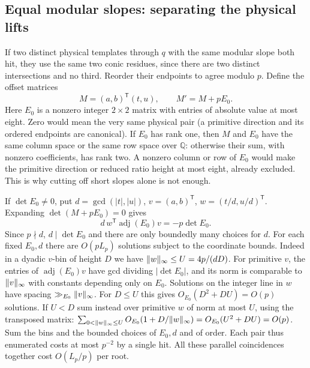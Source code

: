 \documentclass[11pt]{article}
\begin{document}
\subsection{Equal modular slopes: separating the physical lifts}
If two distinct physical templates through $q$ with the same modular slope both hit, they use the same two conic residues, since there are two distinct intersections and no third. Reorder their endpoints to agree modulo $p$. Define the offset matrices
\[
 M=(a,b)^{\mathsf T}(t,u),\qquad M'=M+pE_0.
\]
Here $E_0$ is a nonzero integer $2\times2$ matrix with entries of absolute value at most eight. Zero would mean the very same physical pair (a primitive direction and its ordered endpoints are canonical). If $E_0$ has rank one, then $M$ and $E_0$ have the same column space or the same row space over $\mathbb Q$: otherwise their sum, with nonzero coefficients, has rank two. A nonzero column or row of $E_0$ would make the primitive direction or reduced ratio height at most eight, already excluded. This is why cutting off short slopes alone is not enough.

If $\det E_0\ne0$, put $d=\gcd(|t|,|u|)$, $v=(a,b)^{\mathsf T}$, $w=(t/d,u/d)^{\mathsf T}$. Expanding $\det(M+pE_0)=0$ gives
\[
 d\, w^{\mathsf T}\operatorname{adj}(E_0)v=-p\det E_0.
\]
Since $p\nmid d$, $d\mid\det E_0$ and there are only boundedly many choices for $d$. For each fixed $E_0,d$ there are $O(pL_p)$ solutions subject to the coordinate bounds. Indeed in a dyadic $v$-bin of height $D$ we have $\lVert w\rVert_\infty\le U=4p/(dD)$. For primitive $v$, the entries of $\operatorname{adj}(E_0)v$ have gcd dividing $|\det E_0|$, and its norm is comparable to $\lVert v\rVert_\infty$ with constants depending only on $E_0$. Solutions on the integer line in $w$ have spacing $\gg_{E_0}\lVert v\rVert_\infty$. For $D\le U$ this gives $O_{E_0}(D^2+DU)=O(p)$ solutions. If $U<D$ sum instead over primitive $w$ of norm at most $U$, using the transposed matrix: $\sum_{0<\lVert w\rVert_\infty\le U}O_{E_0}(1+D/\lVert w\rVert_\infty)=O_{E_0}(U^2+DU)=O(p)$. Sum the bins and the bounded choices of $E_0,d$ and of order. Each pair thus enumerated costs at most $p^{-2}$ by a single hit. All these parallel coincidences together cost $O(L_p/p)$ per root.
\end{document}
